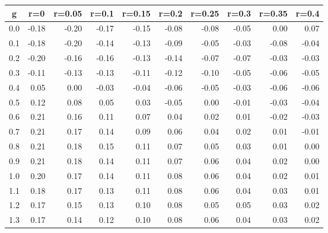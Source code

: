 %
\begin{table}[!tbp]
 \begin{center}
 \begin{tabular}{rrrrrrrrrr}\hline\hline
\multicolumn{1}{c}{g}&\multicolumn{1}{c}{r=0}&\multicolumn{1}{c}{r=0.05}&\multicolumn{1}{c}{r=0.1}&\multicolumn{1}{c}{r=0.15}&\multicolumn{1}{c}{r=0.2}&\multicolumn{1}{c}{r=0.25}&\multicolumn{1}{c}{r=0.3}&\multicolumn{1}{c}{r=0.35}&\multicolumn{1}{c}{r=0.4}\tabularnewline
\hline
0.0&-0.18&-0.20&-0.17&-0.15&-0.08&-0.08&-0.05& 0.00& 0.07\tabularnewline
0.1&-0.18&-0.20&-0.14&-0.13&-0.09&-0.05&-0.03&-0.08&-0.04\tabularnewline
0.2&-0.20&-0.16&-0.16&-0.13&-0.14&-0.07&-0.07&-0.03&-0.03\tabularnewline
0.3&-0.11&-0.13&-0.13&-0.11&-0.12&-0.10&-0.05&-0.06&-0.05\tabularnewline
0.4& 0.05& 0.00&-0.03&-0.04&-0.06&-0.05&-0.03&-0.06&-0.06\tabularnewline
0.5& 0.12& 0.08& 0.05& 0.03&-0.05& 0.00&-0.01&-0.03&-0.04\tabularnewline
0.6& 0.21& 0.16& 0.11& 0.07& 0.04& 0.02& 0.01&-0.02&-0.03\tabularnewline
0.7& 0.21& 0.17& 0.14& 0.09& 0.06& 0.04& 0.02& 0.01&-0.01\tabularnewline
0.8& 0.21& 0.18& 0.15& 0.11& 0.07& 0.05& 0.03& 0.01& 0.00\tabularnewline
0.9& 0.21& 0.18& 0.14& 0.11& 0.07& 0.06& 0.04& 0.02& 0.00\tabularnewline
1.0& 0.20& 0.17& 0.14& 0.11& 0.08& 0.06& 0.04& 0.02& 0.01\tabularnewline
1.1& 0.18& 0.17& 0.13& 0.11& 0.08& 0.06& 0.04& 0.03& 0.01\tabularnewline
1.2& 0.17& 0.15& 0.13& 0.10& 0.08& 0.05& 0.05& 0.03& 0.02\tabularnewline
1.3& 0.17& 0.14& 0.12& 0.10& 0.08& 0.06& 0.04& 0.03& 0.02\tabularnewline
\hline
\end{tabular}

\end{center}

\end{table}

